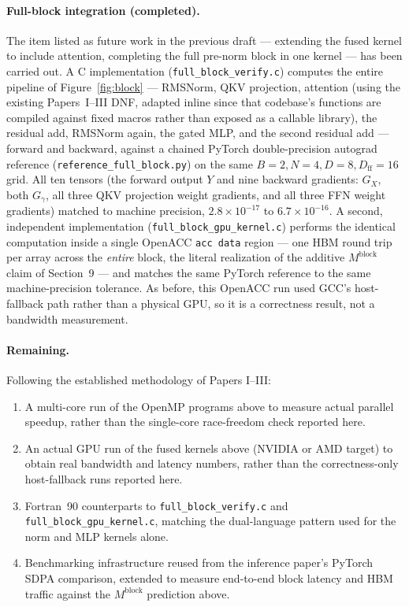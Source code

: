 \documentclass[11pt]{article}
\theoremstyle{definition}
\begin{document}
\paragraph{Full-block integration (completed).} The item listed as
future work in the previous draft --- extending the fused kernel to
include attention, completing the full pre-norm block in one kernel
--- has been carried out. A C implementation
(\texttt{full\_block\_verify.c}) computes the entire pipeline of
Figure~\ref{fig:block} --- RMSNorm, QKV projection, attention (using the
existing Papers~I--III DNF, adapted inline since that codebase's
functions are compiled against fixed macros rather than exposed as a
callable library), the residual add, RMSNorm again, the gated MLP, and
the second residual add --- forward and backward, against a chained
PyTorch double-precision autograd reference
(\texttt{reference\_full\_block.py}) on the same $B{=}2,N{=}4,D{=}8,
D_{\mathrm{ff}}{=}16$ grid. All ten tensors (the forward output $Y$ and
nine backward gradients: $G_X$, both $G_{\gamma}$, all three QKV
projection weight gradients, and all three FFN weight gradients)
matched to machine precision, $2.8\times10^{-17}$ to
$6.7\times10^{-16}$. A second, independent implementation
(\texttt{full\_block\_gpu\_kernel.c}) performs the identical computation
inside a single OpenACC \texttt{acc data} region --- one HBM round trip
per array across the \emph{entire} block, the literal realization of
the additive $M^{\mathrm{block}}$ claim of Section~9 --- and matches the
same PyTorch reference to the same machine-precision tolerance. As
before, this OpenACC run used GCC's host-fallback path rather than a
physical GPU, so it is a correctness result, not a bandwidth
measurement.

\paragraph{Remaining.} Following the established methodology of Papers
I--III:
\begin{enumerate}
  \item A multi-core run of the OpenMP programs above to measure actual
  parallel speedup, rather than the single-core race-freedom check
  reported here.
  \item An actual GPU run of the fused kernels above (NVIDIA or AMD
  target) to obtain real bandwidth and latency numbers, rather than the
  correctness-only host-fallback runs reported here.
  \item Fortran~90 counterparts to \texttt{full\_block\_verify.c} and
  \texttt{full\_block\_gpu\_kernel.c}, matching the dual-language
  pattern used for the norm and MLP kernels alone.
  \item Benchmarking infrastructure reused from the inference paper's
  PyTorch SDPA comparison, extended to measure end-to-end block latency
  and HBM traffic against the $M^{\mathrm{block}}$ prediction above.
\end{enumerate}
\end{document}
